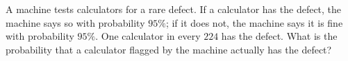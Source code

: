 A machine tests calculators for a rare defect. If a calculator has the defect, the machine says so with probability $95\%$; if it does not, the machine says it is fine with probability $95\%$. One calculator in every $224$ has the defect. What is the probability that a calculator flagged by the machine actually has the defect?
